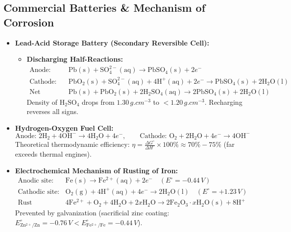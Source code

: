\documentclass[10pt,a4paper]{article}
\begin{document}
\subsection{Commercial Batteries \& Mechanism of Corrosion}
\begin{conceptbox}
\begin{itemize}
  \item \textbf{Lead-Acid Storage Battery (Secondary Reversible Cell):}
  \begin{itemize}
    \item \textbf{Discharging Half-Reactions:}
    \begin{align}
      \text{Anode: } &\mathrm{Pb(s)} + \mathrm{SO_4^{2-}(aq)} \longrightarrow \mathrm{PbSO_4(s)} + 2e^- \\
      \text{Cathode: } &\mathrm{PbO_2(s)} + \mathrm{SO_4^{2-}(aq)} + 4\mathrm{H^+(aq)} + 2e^- \longrightarrow \mathrm{PbSO_4(s)} + 2\mathrm{H_2O(l)} \\
      \text{Net Discharge: } &\mathrm{Pb(s)} + \mathrm{PbO_2(s)} + 2\mathrm{H_2SO_4(aq)} \longrightarrow 2\mathrm{PbSO_4(s)} + 2\mathrm{H_2O(l)}
    \end{align}
    Density of $\mathrm{H_2SO_4}$ drops from $1.30\,\si{g.cm^{-3}}$ to $< 1.20\,\si{g.cm^{-3}}$. Recharging reverses all signs.
  \end{itemize}
  \item \textbf{Hydrogen-Oxygen Fuel Cell:}
  \begin{equation}
    \text{Anode: } 2\mathrm{H_2} + 4\mathrm{OH^-} \to 4\mathrm{H_2O} + 4e^-, \qquad \text{Cathode: } \mathrm{O_2} + 2\mathrm{H_2O} + 4e^- \to 4\mathrm{OH^-}
  \end{equation}
  Theoretical thermodynamic efficiency: $\eta = \frac{\Delta G^\circ}{\Delta H^\circ} \times 100\% \approx 70\%-75\%$ (far exceeds thermal engines).
  \item \textbf{Electrochemical Mechanism of Rusting of Iron:}
  \begin{align}
    \text{Anodic site: } &\mathrm{Fe(s)} \longrightarrow \mathrm{Fe^{2+}(aq)} + 2e^- \quad (E^\circ = -0.44\,\si{V}) \\
    \text{Cathodic site: } &\mathrm{O_2(g)} + 4\mathrm{H^+(aq)} + 4e^- \longrightarrow 2\mathrm{H_2O(l)} \quad (E^\circ = +1.23\,\si{V}) \\
    \text{Rust Formation: } &4\mathrm{Fe^{2+}} + \mathrm{O_2} + 4\mathrm{H_2O} + 2x\mathrm{H_2O} \longrightarrow 2\mathrm{Fe_2O_3}\cdot x\mathrm{H_2O(s)} + 8\mathrm{H^+}
  \end{align}
  Prevented by galvanization (sacrificial zinc coating: $E^\circ_{\mathrm{Zn^{2+}/Zn}} = -0.76\,\si{V} < E^\circ_{\mathrm{Fe^{2+}/Fe}} = -0.44\,\si{V}$).
\end{itemize}
\end{conceptbox}
\end{document}
